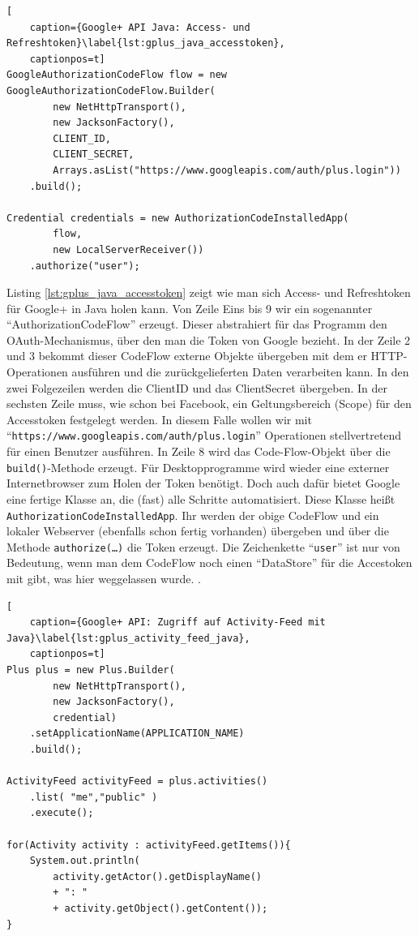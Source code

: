 \begin{lstlisting}[
    caption={Google+ API Java: Access- und Refreshtoken}\label{lst:gplus_java_accesstoken},
    captionpos=t]
GoogleAuthorizationCodeFlow flow = new GoogleAuthorizationCodeFlow.Builder(
        new NetHttpTransport(),
        new JacksonFactory(),
        CLIENT_ID,
        CLIENT_SECRET,
        Arrays.asList("https://www.googleapis.com/auth/plus.login"))
    .build();

Credential credentials = new AuthorizationCodeInstalledApp(
        flow,
        new LocalServerReceiver())
    .authorize("user");
\end{lstlisting}

Listing \ref{lst:gplus_java_accesstoken} zeigt wie man sich Access- und Refreshtoken für Google+ in Java holen kann. Von Zeile Eins bis 9 wir ein sogenannter \enquote{AuthorizationCodeFlow} erzeugt. Dieser abstrahiert für das Programm den OAuth-Mechanismus, über den man die Token von Google bezieht. In der Zeile 2 und 3 bekommt dieser CodeFlow externe Objekte übergeben mit dem er HTTP-Operationen ausführen und die zurückgelieferten Daten verarbeiten kann. In den zwei Folgezeilen werden die ClientID und das ClientSecret übergeben. In der sechsten Zeile muss, wie schon bei Facebook, ein Geltungsbereich (Scope) für den Accesstoken festgelegt werden. In diesem Falle wollen wir mit \enquote{\texttt{https://www.googleapis.com/auth/plus.login}} Operationen stellvertretend für einen Benutzer ausführen. In Zeile 8 wird das Code-Flow-Objekt über die \texttt{build()}-Methode erzeugt. Für Desktopprogramme wird wieder eine externer Internetbrowser zum Holen der Token benötigt. Doch auch dafür bietet Google eine fertige Klasse an, die (fast) alle Schritte automatisiert. Diese Klasse heißt \texttt{AuthorizationCodeInstalledApp}. Ihr werden der obige CodeFlow und ein lokaler Webserver (ebenfalls schon fertig vorhanden) übergeben und über die Methode \texttt{authorize(\dots)} die Token erzeugt. Die Zeichenkette \enquote{\texttt{user}} ist nur von Bedeutung, wenn man dem CodeFlow noch einen \enquote{DataStore} für die Accestoken mit gibt, was hier weggelassen wurde. .

\begin{lstlisting}[
    caption={Google+ API: Zugriff auf Activity-Feed mit Java}\label{lst:gplus_activity_feed_java},
    captionpos=t]
Plus plus = new Plus.Builder(
        new NetHttpTransport(), 
        new JacksonFactory(),
        credential)
    .setApplicationName(APPLICATION_NAME)
    .build();

ActivityFeed activityFeed = plus.activities()
    .list( "me","public" )
    .execute();

for(Activity activity : activityFeed.getItems()){
    System.out.println(
        activity.getActor().getDisplayName() 
        + ": " 
        + activity.getObject().getContent());
}
\end{lstlisting}

